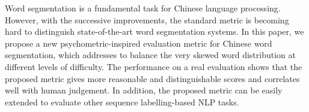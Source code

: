 Word segmentation is a fundamental task for Chinese language processing. However, with the successive improvements, the standard metric is becoming hard to distinguish state-of-the-art word segmentation systems. In this paper, we propose a new psychometric-inspired evaluation metric for Chinese word segmentation, which addresses to balance the very skewed word distribution at different levels of difficulty. The performance on a real evaluation shows that the proposed metric gives more reasonable and distinguishable scores and correlates well with human judgement. In addition, the proposed metric can be easily extended to evaluate other sequence labelling-based NLP tasks.
